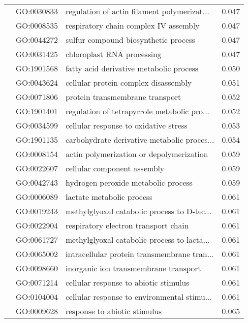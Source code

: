 \begin{longtable}{lllr}
   & GO:0030833 &  regulation of actin filament polymerizat... &         0.047 \\
   & GO:0008535 &        respiratory chain complex IV assembly &         0.047 \\
   & GO:0044272 &         sulfur compound biosynthetic process &         0.047 \\
   & GO:0031425 &                   chloroplast RNA processing &         0.047 \\
   & GO:1901568 &      fatty acid derivative metabolic process &         0.050 \\
   & GO:0043624 &         cellular protein complex disassembly &         0.051 \\
   & GO:0071806 &              protein transmembrane transport &         0.052 \\
   & GO:1901401 &  regulation of tetrapyrrole metabolic pro... &         0.052 \\
   & GO:0034599 &        cellular response to oxidative stress &         0.053 \\
   & GO:1901135 &  carbohydrate derivative metabolic proces... &         0.054 \\
   & GO:0008154 &     actin polymerization or depolymerization &         0.059 \\
   & GO:0022607 &                  cellular component assembly &         0.059 \\
   & GO:0042743 &          hydrogen peroxide metabolic process &         0.059 \\
   & GO:0006089 &                    lactate metabolic process &         0.061 \\
   & GO:0019243 &  methylglyoxal catabolic process to D-lac... &         0.061 \\
   & GO:0022904 &         respiratory electron transport chain &         0.061 \\
   & GO:0061727 &  methylglyoxal catabolic process to lacta... &         0.061 \\
   & GO:0065002 &  intracellular protein transmembrane tran... &         0.061 \\
   & GO:0098660 &        inorganic ion transmembrane transport &         0.061 \\
   & GO:0071214 &        cellular response to abiotic stimulus &         0.061 \\
   & GO:0104004 &  cellular response to environmental stimu... &         0.061 \\
   & GO:0009628 &                 response to abiotic stimulus &         0.065 \\

\end{longtable}
